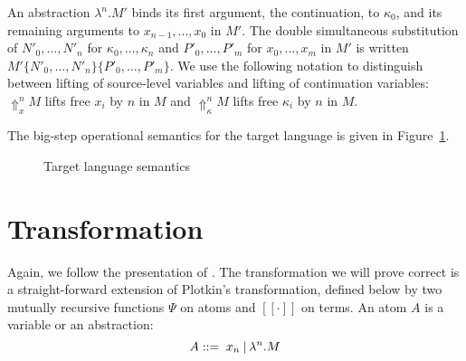 \documentclass[a4paper,11pt,draft]{article}
\newcommand{\kw}[1]{\mathtt{#1}}
\begin{document}
An abstraction $\lambda^{n}.M'$ binds its first argument, the continuation,
to $\kappa_{0}$, and its remaining arguments to $x_{n-1}, \ldots, x_{0}$ in
$M'$.
The double simultaneous substitution of $N'_{0}, \ldots, N'_{n}$ for
$\kappa_{0}, \ldots, \kappa_{n}$ and $P'_{0}, \ldots, P'_{m}$ for
$x_{0}, \ldots, x_{m}$ in $M'$ is written
$M'\{N'_{0}, \ldots, N'_{n}\}\{P'_{0}, \ldots, P'_{m}\}$.
We use the following notation to distinguish between lifting of
source-level variables and lifting of continuation variables:
$\Uparrow_{x}^{n} M$ lifts free $x_{i}$ by $n$ in $M$ and
$\Uparrow_{\kappa}^{n} M$ lifts free $\kappa_{i}$ by $n$ in $M$.

The big-step operational semantics for the target language is given in
Figure~\ref{fig:targetsemantics}.

\begin{figure}
\caption{Target language semantics}
\label{fig:targetsemantics}
\end{figure}


\section{Transformation}\label{sec:transformation}

Again, we follow the presentation of \cite{Dargaye-Leroy-07}. The transformation
we will prove correct is a straight-forward extension of
Plotkin's transformation, defined below by two mutually recursive functions
$\Psi$ on atoms and $[\![\cdot]\!]$ on terms. An atom $A$ is a variable or an
abstraction:
\begin{equation*}
A ::= \; x_{n} \: \text{\textbar} \: \lambda^{n}.M
\end{equation*}
\end{document}
